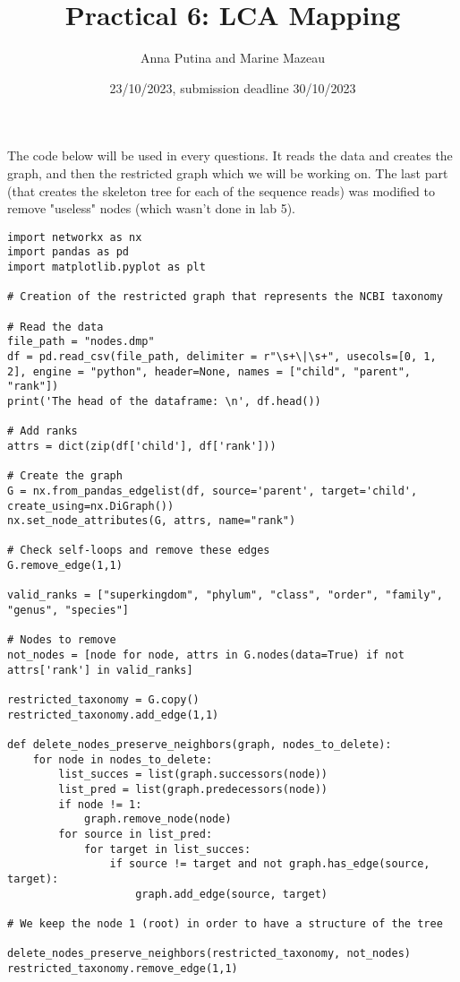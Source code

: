 \documentclass[12 pt,a4paper]{article}
\title{Practical 6: LCA Mapping}
\author{Anna Putina and Marine Mazeau}
\date{23/10/2023, submission deadline 30/10/2023}
\begin{document}
\maketitle
The code below will be used in every questions. It reads the data and creates the graph, and then the restricted graph which we will be working on. The last part (that creates the skeleton tree for each of the sequence reads) was modified to remove "useless" nodes (which wasn't done in lab 5).
\begin{verbatim}
import networkx as nx
import pandas as pd
import matplotlib.pyplot as plt

# Creation of the restricted graph that represents the NCBI taxonomy 

# Read the data
file_path = "nodes.dmp"
df = pd.read_csv(file_path, delimiter = r"\s+\|\s+", usecols=[0, 1, 2], engine = "python", header=None, names = ["child", "parent", "rank"]) 
print('The head of the dataframe: \n', df.head())

# Add ranks
attrs = dict(zip(df['child'], df['rank']))

# Create the graph
G = nx.from_pandas_edgelist(df, source='parent', target='child', create_using=nx.DiGraph())
nx.set_node_attributes(G, attrs, name="rank")

# Check self-loops and remove these edges
G.remove_edge(1,1)

valid_ranks = ["superkingdom", "phylum", "class", "order", "family", "genus", "species"]

# Nodes to remove
not_nodes = [node for node, attrs in G.nodes(data=True) if not attrs['rank'] in valid_ranks]

restricted_taxonomy = G.copy()
restricted_taxonomy.add_edge(1,1)

def delete_nodes_preserve_neighbors(graph, nodes_to_delete):
    for node in nodes_to_delete:
        list_succes = list(graph.successors(node)) 
        list_pred = list(graph.predecessors(node))
        if node != 1:
            graph.remove_node(node)
        for source in list_pred:
            for target in list_succes:
                if source != target and not graph.has_edge(source, target):
                    graph.add_edge(source, target)

# We keep the node 1 (root) in order to have a structure of the tree 

delete_nodes_preserve_neighbors(restricted_taxonomy, not_nodes)
restricted_taxonomy.remove_edge(1,1)


\end{verbatim}
\end{document}
